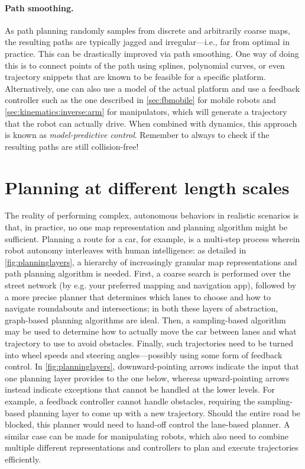 \paragraph{Path smoothing.}

As path planning randomly samples from discrete and arbitrarily coarse maps, the resulting paths are typically jagged and irregular---i.e., far from optimal in practice. This can be drastically improved via path smoothing. One way of doing this is to connect points of the path using splines, polynomial curves, or even trajectory snippets that are known to be feasible for a specific platform. Alternatively, one can also use a model of the actual platform and use a feedback controller such as the one described in \cref{sec:fbmobile} for mobile robots and \cref{sec:kinematics:inverse:arm} for manipulators, which will generate a trajectory that the robot can actually drive.
When combined with dynamics, this approach is known as \textsl{model-predictive control}. Remember to always to check if the resulting paths are still collision-free!

\section{Planning at different length scales}

The reality of performing complex, autonomous behaviors in realistic scenarios is that, in practice, no one map representation and planning algorithm might be sufficient.
Planning a route for a car, for example, is a multi-step process wherein robot autonomy interleaves with human intelligence: as detailed in \cref{fig:planninglayers}, a hierarchy of increasingly granular map representations and path planning algorithm is needed.
First, a coarse search is performed over the street network (by e.g. your preferred mapping and navigation app), followed by a more precise planner that determines which lanes to choose and how to navigate roundabouts and intersections; in both these layers of abstraction, graph-based planning algorithms are ideal.
Then, a sampling-based algorithm may be used to determine how to actually move the car between lanes and what trajectory to use to avoid obstacles.
Finally, such trajectories need to be turned into wheel speeds and steering angles---possibly using some form of feedback control.
In \cref{fig:planninglayers}, downward-pointing arrows indicate the input that one planning layer provides to the one below, whereas upward-pointing arrows instead indicate exceptions that cannot be handled at the lower levels. For example, a feedback controller cannot handle obstacles, requiring the sampling-based planning layer to come up with a new trajectory. Should the entire road be blocked, this planner would need to hand-off control the lane-based planner. A similar case can be made for manipulating robots, which also need to combine multiple different representations and controllers to plan and execute trajectories efficiently.

